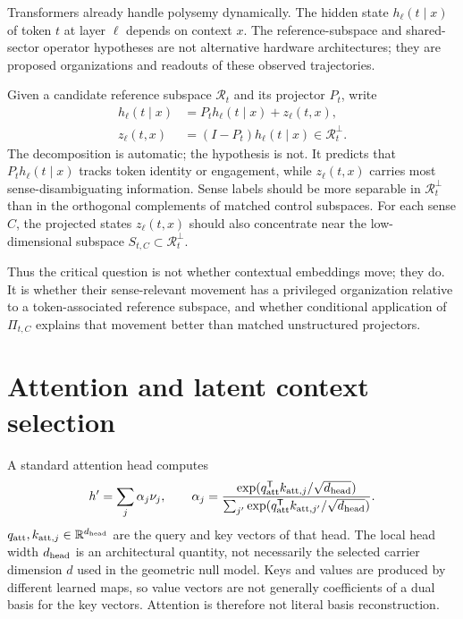 \documentclass[
  aps,
  reprint,
  superscriptaddress,
  floatfix,
  nofootinbib,
  longbibliography
]{revtex4-2}
\newcommand{\R}{\mathbb{R}}
\newcommand{\T}{^{\mathsf{T}}}
\begin{document}
Transformers already handle polysemy dynamically. The hidden state
$h_\ell(t\mid x)$ of token $t$ at layer $\ell$ depends on context $x$.
The reference-subspace and shared-sector operator hypotheses are not
alternative hardware architectures; they are proposed organizations and
readouts of these observed trajectories.

Given a candidate reference subspace $\mathcal R_t$ and its projector $P_t$,
write
%
\begin{align}
\label{eq:layer-decomp}
h_\ell(t\mid x)
&=P_t h_\ell(t\mid x)+z_\ell(t,x),\\
z_\ell(t,x)&=(I-P_t)h_\ell(t\mid x)
\in\mathcal R_t^\perp.\nonumber
\end{align}
%
The decomposition is automatic; the hypothesis is not. It predicts that
$P_t h_\ell(t\mid x)$ tracks token identity or engagement, while
$z_\ell(t,x)$ carries most sense-disambiguating information. Sense labels
should be more separable in $\mathcal R_t^\perp$ than in the orthogonal
complements of matched control subspaces. For each sense $C$, the projected
states $z_\ell(t,x)$ should also concentrate near the low-dimensional
subspace $S_{t,C}\subset\mathcal R_t^\perp$.

Thus the critical question is not whether contextual embeddings move; they
do. It is whether their sense-relevant movement has a privileged organization
relative to a token-associated reference subspace, and whether conditional
application of $\Pi_{t,C}$ explains that movement better than matched
unstructured projectors.

\section{Attention and latent context selection}
\label{sec:attention}

A standard attention head computes
%
\begin{equation}
\label{eq:attention}
h'=\sum_j\alpha_j\nu_j,
\qquad
\alpha_j=
\frac{\exp(q_{\rm att}\T k_{{\rm att},j}/\sqrt{d_{\rm head}})}
{\sum_{j'}\exp(q_{\rm att}\T k_{{\rm att},j'}/\sqrt{d_{\rm head}})} .
\end{equation}
%
$q_{\rm att},k_{{\rm att},j}\in\R^{d_{\rm head}}$ are the query and key
vectors of that head.  The local head width $d_{\rm head}$ is an architectural
quantity, not necessarily the selected carrier dimension $d$ used in the
geometric null model.
Keys and values are produced by different learned maps, so value vectors
are not generally coefficients of a dual basis for the key vectors.
Attention is therefore not literal basis reconstruction.
\end{document}
